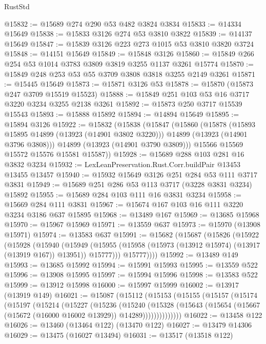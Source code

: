 \begin{lexlean}{RustStd}
\begin{coremodule}
{\begin{coremodule}
{{{{{{{{{{{{{{{{{{{{{{{{{{{{{{{{{{{{{@15832 := @15689 @274 @290 @53 @482 @3824 @3834
@15833 := @14334 @15649
@15838 := @15833 @3126 @274 @53 @3810 @3822
@15839 := @14137 @15649
@15847 := @15839 @3126 @223 @273 @1015 @53 @3810 @3820 @3724
@15848 := @14151 @15649
@15849 := @15848 @3126
@15860 := @15849 @266 @254 @53 @1014 @3783 @3809 @3819 @3255 @1137 @3261 @15774
@15870 := @15849 @248 @253 @53 @55 @3709 @3808 @3818 @3255 @2149 @3261
@15871 := @15445 @15649
@15873 := @15871 @3126 @53
@15878 := @15870 (@15873 @247 @3709 @15519 @15523)
@15888 := @15849 @251 @103 @53 @16 @3717 @3220 @3234 @3255 @2138 @3261
@15892 := @15873 @250 @3717 @15539 @15543
@15893 := @15888 @15892
@15894 := @14894 @15649
@15895 := @15894 @3126
@15922 := @15832
    (@15838
      (@15847
        (@15860
          (@15878
            (@15893 @15895 @14899 (@13923 (@14901 @3802 @3220)))
            @14899
            (@13923 (@14901 @3796 @3808)))
          @14899
          (@13923 (@14901 @3790 @3809)))
        @15566
        @15569
        @15572
        @15576
        @15581
        @15587))
@15928 := @15689 @288 @103 @281 @16 @3832 @3234
@15932 := LexLeanPreservation.Rust.Corr.buildPair @13453 @13455 @13457
@15940 := @15932 @15649 @3126 @251 @284 @53 @111 @3717 @3831
@15949 := @15689 @251 @286 @53 @113 @3717 (@3228 @3831 @3234) @15892
@15955 := @15689 @284 @103 @111 @16 @3831 @3234
@15958 := @15669 @284 @111 @3831
@15967 := @15674 @167 @103 @16 @111 @3220 @3234 @3186 @637 @15895
@15968 := @13489 @167
@15969 := @13685 @15968
@15970 := @15967 @15969
@15971 := @13559 @637
@15973 := @15970 (@13908 @15971)
@15974 := @13583 @637
@15991 := @15682
    (@15687
      (@15826
        (@15922
          (@15928
            (@15940
              (@15949
                (@15955 (@15958 (@15973 (@13912 @15974) (@13917 (@13919 @167)) @13951)) @15777)))
            @15777))))
@15992 := @13489 @149
@15993 := @13685 @15992
@15994 := @15991 @15993
@15995 := @13559 @522
@15996 := @13908 @15995
@15997 := @15994 @15996
@15998 := @13583 @522
@15999 := @13912 @15998
@16000 := @15997 @15999
@16002 := @13917 (@13919 @149)
@16021 := @15087
    (@15112
      (@15153
        (@15155
          (@15157
            (@15174
              (@15197
                (@15214
                  (@15227
                    (@15236
                      (@15240
                        (@15328
                          (@15643
                            (@15654 (@15667 (@15672 (@16000 @16002 @13929)) @14289))))))))))))))
@16022 := @13458 @122
@16026 := @13460 (@13464 @122) (@13470 @122)
@16027 := @13479 @14306
@16029 := @13475 (@16027 @13494)
@16031 := @13517 (@13518 @122)
}}}}}}}}}}}}}}}}}}}}}}}}}}}}}}}}}}}}}
\end{coremodule}}
\end{coremodule}
\end{lexlean}
